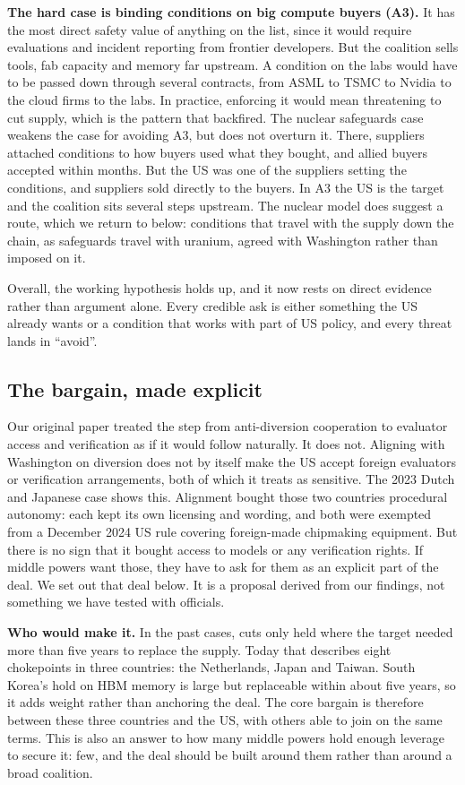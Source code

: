 \documentclass[11pt]{article}
\begin{document}
\textbf{The hard case is binding conditions on big compute buyers (A3).} It has the most direct safety value of anything on the list, since it would require evaluations and incident reporting from frontier developers. But the coalition sells tools, fab capacity and memory far upstream. A condition on the labs would have to be passed down through several contracts, from ASML to TSMC to Nvidia to the cloud firms to the labs. In practice, enforcing it would mean threatening to cut supply, which is the pattern that backfired. The nuclear safeguards case weakens the case for avoiding A3, but does not overturn it. There, suppliers attached conditions to how buyers used what they bought, and allied buyers accepted within months. But the US was one of the suppliers setting the conditions, and suppliers sold directly to the buyers. In A3 the US is the target and the coalition sits several steps upstream. The nuclear model does suggest a route, which we return to below: conditions that travel with the supply down the chain, as safeguards travel with uranium, agreed with Washington rather than imposed on it.

Overall, the working hypothesis holds up, and it now rests on direct evidence rather than argument alone. Every credible ask is either something the US already wants or a condition that works with part of US policy, and every threat lands in ``avoid''.

\subsection{The bargain, made explicit}
\label{sec:bargain}

Our original paper treated the step from anti-diversion cooperation to evaluator access and verification as if it would follow naturally. It does not. Aligning with Washington on diversion does not by itself make the US accept foreign evaluators or verification arrangements, both of which it treats as sensitive. The 2023 Dutch and Japanese case shows this. Alignment bought those two countries procedural autonomy: each kept its own licensing and wording, and both were exempted from a December 2024 US rule covering foreign-made chipmaking equipment. But there is no sign that it bought access to models or any verification rights. If middle powers want those, they have to ask for them as an explicit part of the deal. We set out that deal below. It is a proposal derived from our findings, not something we have tested with officials.

\textbf{Who would make it.} In the past cases, cuts only held where the target needed more than five years to replace the supply. Today that describes eight chokepoints in three countries: the Netherlands, Japan and Taiwan. South Korea's hold on HBM memory is large but replaceable within about five years, so it adds weight rather than anchoring the deal. The core bargain is therefore between these three countries and the US, with others able to join on the same terms. This is also an answer to how many middle powers hold enough leverage to secure it: few, and the deal should be built around them rather than around a broad coalition.
\end{document}
